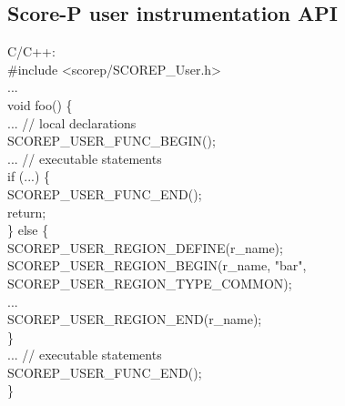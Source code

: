 \documentclass[a4paper]{article}
\begin{document}
\subsection*{{\sc Score-P} user instrumentation API}
\label{sec:Scorep_inst}
    \begin{minipage}[t]{0.49\linewidth}
      C/C++: \\\ttfamily
      \#include <scorep/SCOREP\_User.h> \\
      ... \\
      void foo() \{ \\
      \hspace*{1ex} ... // local declarations \\
      \hspace*{1ex} SCOREP\_USER\_FUNC\_BEGIN(); \\
      \hspace*{1ex} ... // executable statements \\
      \hspace*{1ex} if (...) \{ \\
      \hspace*{2ex} SCOREP\_USER\_FUNC\_END(); \\
      \hspace*{2ex} return; \\
      \hspace*{1ex} \} else \{ \\
      \hspace*{2ex} SCOREP\_USER\_REGION\_DEFINE(r\_name); \\
      \hspace*{2ex} SCOREP\_USER\_REGION\_BEGIN(r\_name, "bar", \\
      \hspace*{10ex} SCOREP\_USER\_REGION\_TYPE\_COMMON); \\
      \hspace*{2ex} ... \\
      \hspace*{2ex} SCOREP\_USER\_REGION\_END(r\_name); \\
      \hspace*{1ex} \} \\
      \hspace*{1ex} ... // executable statements \\
      \hspace*{1ex} SCOREP\_USER\_FUNC\_END(); \\
      \}
    \end{minipage}
\end{document}
